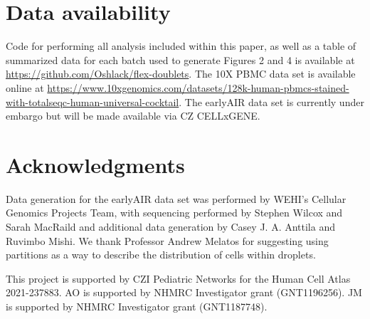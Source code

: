 \documentclass[unnumsec,webpdf,modern,large]{oup-authoring-template}
\begin{document}
	
	
	\section{Data availability}
	\label{sec:data availability}
	
	Code for performing all analysis included within this paper, as well as a table of summarized data for each batch used to generate Figures 2 and 4 is available at \url{https://github.com/Oshlack/flex-doublets}.
	The 10X PBMC data set is available online at \url{https://www.10xgenomics.com/datasets/128k-human-pbmcs-stained-with-totalseqc-human-universal-cocktail}. 
	The earlyAIR data set is currently under embargo but will be made available via CZ CELLxGENE. 
	
	
	\section{Acknowledgments}
	\label{acknowledgements}
	
	Data generation for the earlyAIR data set was performed by WEHI’s Cellular Genomics Projects Team, with sequencing performed by Stephen Wilcox and Sarah MacRaild and additional data generation by Casey J. A. Anttila and Ruvimbo Mishi.
	We thank Professor Andrew Melatos for suggesting using partitions as a way to describe the distribution of cells within droplets. 
	
	This project is supported by CZI Pediatric Networks for the Human Cell Atlas 2021-237883.
	AO is supported by NHMRC Investigator grant (GNT1196256). 
	JM is supported by NHMRC Investigator grant (GNT1187748). 
	
	
	
	 
	
	
	
	
	
\end{document}
